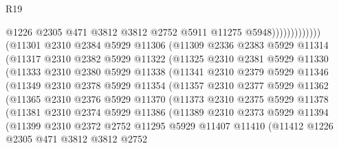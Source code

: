 \begin{lexlean}{R19}
\begin{coremodule}
                                  @1226
                                  @2305
                                  @471
                                  @3812
                                  @3812
                                  @2752
                                  @5911
                                  @11275
                                  @5948)))))))))))))
        (@11301
          @2310
          @2384
          @5929
          @11306
          (@11309
            @2336
            @2383
            @5929
            @11314
            (@11317
              @2310
              @2382
              @5929
              @11322
              (@11325
                @2310
                @2381
                @5929
                @11330
                (@11333
                  @2310
                  @2380
                  @5929
                  @11338
                  (@11341
                    @2310
                    @2379
                    @5929
                    @11346
                    (@11349
                      @2310
                      @2378
                      @5929
                      @11354
                      (@11357
                        @2310
                        @2377
                        @5929
                        @11362
                        (@11365
                          @2310
                          @2376
                          @5929
                          @11370
                          (@11373
                            @2310
                            @2375
                            @5929
                            @11378
                            (@11381
                              @2310
                              @2374
                              @5929
                              @11386
                              (@11389
                                @2310
                                @2373
                                @5929
                                @11394
                                (@11399
                                  @2310
                                  @2372
                                  @2752
                                  @11295
                                  @5929
                                  @11407
                                  @11410
                                  (@11412
                                    @1226
                                    @2305
                                    @471
                                    @3812
                                    @3812
                                    @2752

\end{coremodule}
\end{lexlean}
